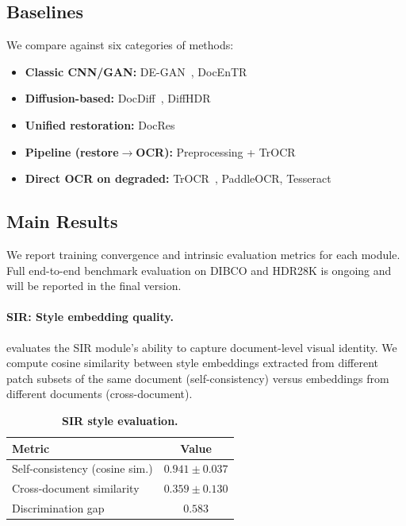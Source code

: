 \documentclass[conference]{IEEEtran}
\newcommand{\sir}{\textsc{SIR}}
\begin{document}
\subsection{Baselines}
\label{sec:baselines}

We compare against six categories of methods:
\begin{itemize}[leftmargin=*,nosep]
  \item \textbf{Classic CNN/GAN:} DE-GAN~\cite{souibgui2020degan}, DocEnTR~\cite{souibgui2022docentr}
  \item \textbf{Diffusion-based:} DocDiff~\cite{yang2023docdiff}, DiffHDR~\cite{chen2024diffhdr}
  \item \textbf{Unified restoration:} DocRes~\cite{zhang2024docres}
  \item \textbf{Pipeline (restore$\rightarrow$OCR):} Preprocessing + TrOCR
  \item \textbf{Direct OCR on degraded:} TrOCR~\cite{li2021trocr}, PaddleOCR, Tesseract
\end{itemize}

\subsection{Main Results}
\label{sec:results}

We report training convergence and intrinsic evaluation metrics for each module.
Full end-to-end benchmark evaluation on DIBCO and HDR28K is ongoing and will be
reported in the final version.

\paragraph{SIR: Style embedding quality.}
 evaluates the \sir{} module's ability to capture
document-level visual identity.  We compute cosine similarity between style
embeddings extracted from different patch subsets of the same document
(self-consistency) versus embeddings from different documents (cross-document).

\begin{table}[t]
  \centering
  \small
  \caption{\textbf{SIR style evaluation.}}
  \label{tab:sir_results}
  \begin{tabular}{lc}
    \toprule
    \textbf{Metric} & \textbf{Value} \\
    \midrule
    Self-consistency (cosine sim.)    & $0.941 \pm 0.037$ \\
    Cross-document similarity         & $0.359 \pm 0.130$ \\
    Discrimination gap                & $0.583$ \\
    \bottomrule
  \end{tabular}
\end{table}
\end{document}
